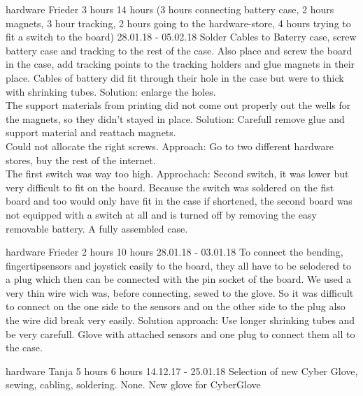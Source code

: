 	{hardware}%
	{Frieder}%
	{3 hours}%
	{14 hours (3 hours connecting battery case, 2 hours magnets, 3 hour tracking, 2 hours going to the hardware-store, 4 hours trying to fit a switch to the board)}%
	{28.01.18 - 05.02.18}%
	{Solder Cables to Baterry case, screw battery case and tracking to the rest of the case. Also place and screw the board in the case, add tracking points to the tracking holders and glue magnets in their place.}%
	{Cables of battery did fit through their hole in the case but were to thick with shrinking tubes. Solution: enlarge the holes. \\
	The support materials from printing did not come out properly out the wells for the magnets, so they didn't stayed in place. Solution: Carefull remove glue and support material and reattach magnets.\\
	Could not allocate the right screws. Approach: Go to two different hardware stores, buy the rest of the internet.\\
	The first switch was way too high. Approchach: Second switch, it was lower but very difficult to fit on the board. Because the switch was soldered on the fist board and too would only have fit in the case if  shortened, the second board was not equipped with a switch at all and is turned off by removing the easy removable battery.}%
	{A fully assembled case.}%
	
	{hardware}%
	{Frieder}%
	{2 hours}%
	{10 hours}%
	{28.01.18 - 03.01.18}%
	{To connect the bending, fingertipsensors and joystick easily to the board, they all have to be selodered to a plug which then can be connected with the pin socket of the board.}%
	{We used a very thin wire wich was, before connecting, sewed to the glove. So it was difficult to connect on the one side to the sensors and on the other side to the plug also the wire did break very easily. Solution approach: Use longer shrinking tubes and be very carefull.}%
	{Glove with attached sensors and one plug to connect them all to the case.}%
	
	{hardware}%
	{Tanja}%
	{5 hours}%
	{6 hours}%
	{14.12.17 - 25.01.18}%
	{Selection of new Cyber Glove, sewing, cabling, soldering.}%
	{None.}%
	{New glove for CyberGlove}%
		
